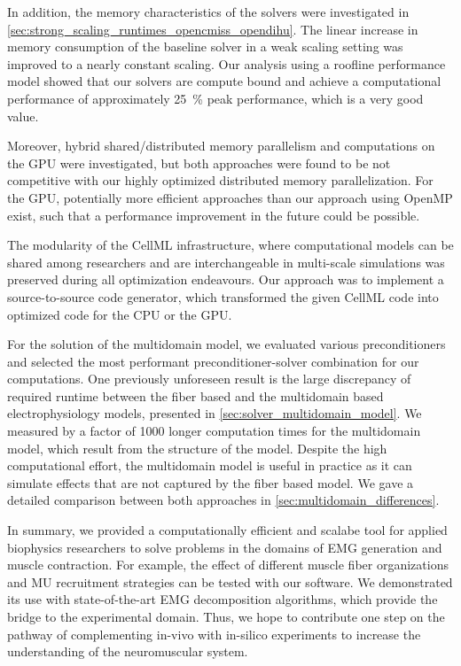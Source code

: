 In addition, the memory characteristics of the solvers were investigated in \cref{sec:strong_scaling_runtimes_opencmiss_opendihu}. 
The linear increase in memory consumption of the baseline solver in a weak scaling setting was improved to a nearly constant scaling. Our analysis using a roofline performance model showed that our solvers are compute bound and achieve a computational performance of approximately \SI{25}{\percent} peak performance, which is a very good value.

Moreover, hybrid shared/distributed memory parallelism and computations on the GPU were investigated, but both approaches were found to be not competitive with our highly optimized distributed memory parallelization. For the GPU, potentially more efficient approaches than our approach using OpenMP exist, such that a performance improvement in the future could be possible.

The modularity of the CellML infrastructure, where computational models can be shared among researchers and are interchangeable in multi-scale simulations was preserved during all optimization endeavours. Our approach was to implement a source-to-source code generator, which transformed the given CellML code into optimized code for the CPU or the GPU.

For the solution of the multidomain model, we evaluated various preconditioners and selected the most performant preconditioner-solver combination for our computations.
One previously unforeseen result is the large discrepancy of required runtime between the fiber based and the multidomain based electrophysiology models, presented in \cref{sec:solver_multidomain_model}. We measured by a factor of 1000 longer computation times for the multidomain model, which result from the structure of the model. Despite the high computational effort, the multidomain model is useful in practice as it can simulate effects that are not captured by the fiber based model. We gave a detailed comparison between both approaches in \cref{sec:multidomain_differences}.

In summary, we provided a computationally efficient and scalabe tool for applied biophysics researchers to solve problems in the domains of EMG generation and muscle contraction. For example, the effect of different muscle fiber organizations and MU recruitment strategies can be tested with our software. We demonstrated its use with state-of-the-art EMG decomposition algorithms, which provide the bridge to the experimental domain.
Thus, we hope to contribute one step on the pathway of complementing in-vivo with in-silico experiments to increase the understanding of the neuromuscular system.

